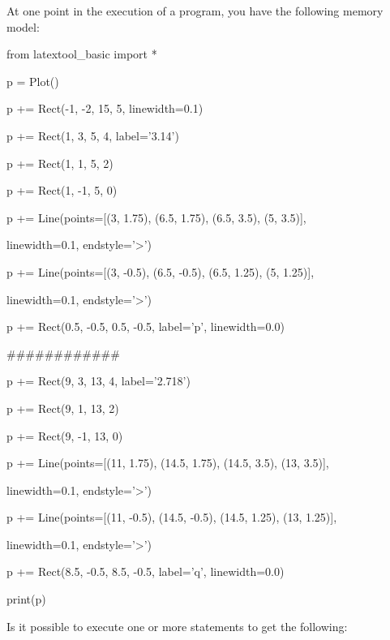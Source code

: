 At one point in the execution of a program, you have the following memory model:

\begin{python}

from latextool_basic import *

p = Plot()



p += Rect(-1, -2, 15, 5, linewidth=0.1)



p += Rect(1, 3, 5, 4, label='3.14')

p += Rect(1, 1, 5, 2)

p += Rect(1, -1, 5, 0)



p += Line(points=[(3, 1.75), (6.5, 1.75), (6.5, 3.5), (5, 3.5)],

          linewidth=0.1, endstyle='>')

p += Line(points=[(3, -0.5), (6.5, -0.5), (6.5, 1.25), (5, 1.25)],

          linewidth=0.1, endstyle='>')



p += Rect(0.5, -0.5, 0.5, -0.5, label='p', linewidth=0.0)

############



p += Rect(9, 3, 13, 4, label='2.718')

p += Rect(9, 1, 13, 2)

p += Rect(9, -1, 13, 0)



p += Line(points=[(11, 1.75), (14.5, 1.75), (14.5, 3.5), (13, 3.5)],

          linewidth=0.1, endstyle='>')

p += Line(points=[(11, -0.5), (14.5, -0.5), (14.5, 1.25), (13, 1.25)],

          linewidth=0.1, endstyle='>')



p += Rect(8.5, -0.5, 8.5, -0.5, label='q', linewidth=0.0)



print(p)

\end{python}



Is it possible to execute one or more statements to get the following:

